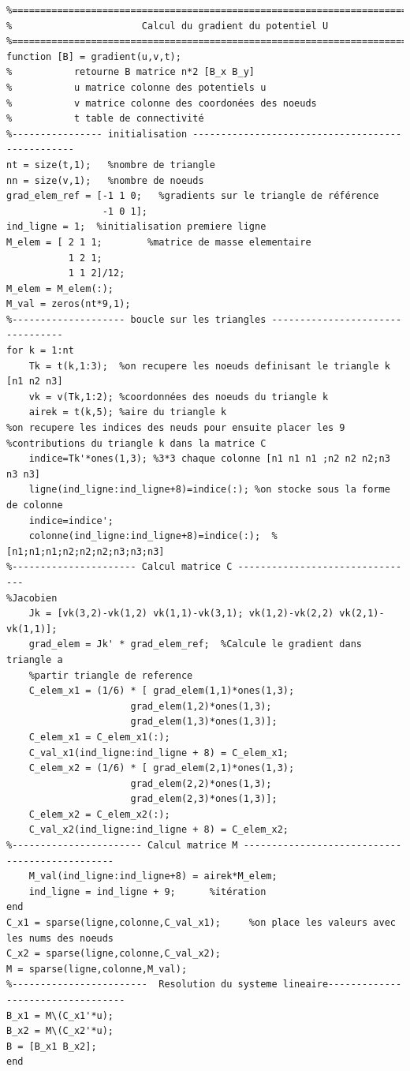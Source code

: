 \documentclass[a4paper,12pt,titlepage]{report}
\begin{document}
\begin{onehalfspace}
\begin{appendix}
\begin{verbatim}
%=========================================================================
%                       Calcul du gradient du potentiel U
%=========================================================================
function [B] = gradient(u,v,t);
%           retourne B matrice n*2 [B_x B_y]
%           u matrice colonne des potentiels u
%           v matrice colonne des coordonées des noeuds
%           t table de connectivité
%---------------- initialisation -------------------------------------------------
nt = size(t,1);   %nombre de triangle
nn = size(v,1);   %nombre de noeuds
grad_elem_ref = [-1 1 0;   %gradients sur le triangle de référence
                 -1 0 1];
ind_ligne = 1;  %initialisation premiere ligne
M_elem = [ 2 1 1;        %matrice de masse elementaire
	       1 2 1;
	       1 1 2]/12;
M_elem = M_elem(:);
M_val = zeros(nt*9,1);
%-------------------- boucle sur les triangles ---------------------------------
for k = 1:nt
	Tk = t(k,1:3);  %on recupere les noeuds definisant le triangle k  [n1 n2 n3]
    vk = v(Tk,1:2); %coordonnées des noeuds du triangle k   
    airek = t(k,5); %aire du triangle k
%on recupere les indices des neuds pour ensuite placer les 9
%contributions du triangle k dans la matrice C
    indice=Tk'*ones(1,3); %3*3 chaque colonne [n1 n1 n1 ;n2 n2 n2;n3 n3 n3] 
    ligne(ind_ligne:ind_ligne+8)=indice(:); %on stocke sous la forme de colonne
    indice=indice';                                 
    colonne(ind_ligne:ind_ligne+8)=indice(:);  %[n1;n1;n1;n2;n2;n2;n3;n3;n3]
%---------------------- Calcul matrice C --------------------------------
%Jacobien
	Jk = [vk(3,2)-vk(1,2) vk(1,1)-vk(3,1); vk(1,2)-vk(2,2) vk(2,1)-vk(1,1)];
	grad_elem = Jk' * grad_elem_ref;  %Calcule le gradient dans triangle a 
	%partir triangle de reference
	C_elem_x1 = (1/6) * [ grad_elem(1,1)*ones(1,3);
                      grad_elem(1,2)*ones(1,3);
                      grad_elem(1,3)*ones(1,3)];
	C_elem_x1 = C_elem_x1(:);
	C_val_x1(ind_ligne:ind_ligne + 8) = C_elem_x1;
	C_elem_x2 = (1/6) * [ grad_elem(2,1)*ones(1,3);
                      grad_elem(2,2)*ones(1,3);
                      grad_elem(2,3)*ones(1,3)];
	C_elem_x2 = C_elem_x2(:);
	C_val_x2(ind_ligne:ind_ligne + 8) = C_elem_x2;
%----------------------- Calcul matrice M -----------------------------------------------
	M_val(ind_ligne:ind_ligne+8) = airek*M_elem;
	ind_ligne = ind_ligne + 9;      %itération
end
C_x1 = sparse(ligne,colonne,C_val_x1);     %on place les valeurs avec les nums des noeuds
C_x2 = sparse(ligne,colonne,C_val_x2);
M = sparse(ligne,colonne,M_val);
%------------------------  Resolution du systeme lineaire----------------------------------
B_x1 = M\(C_x1'*u);
B_x2 = M\(C_x2'*u);
B = [B_x1 B_x2];
end
\end{verbatim}


\end{appendix}
\end{onehalfspace}
\end{document}
